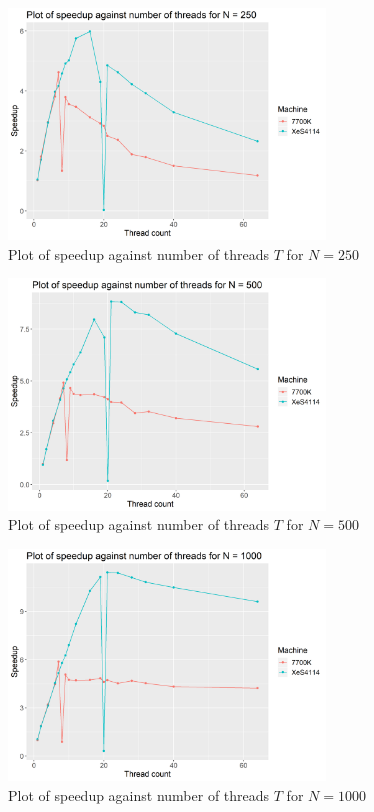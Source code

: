 \documentclass[12pt]{article}
\begin{document}
\begin{figure}[H]
    \centering
    \includegraphics[width=0.75\textwidth]{./processedResults/par-250N-speedup}
    \caption{Plot of speedup against number of threads $T$ for $N = 250$}
    \label{fig:par-250N-speedup}
\end{figure}

\begin{figure}[H]
    \centering
    \includegraphics[width=0.75\textwidth]{./processedResults/par-500N-speedup}
    \caption{Plot of speedup against number of threads $T$ for $N = 500$}
    \label{fig:par-500N-speedup}
\end{figure}

\begin{figure}[H]
    \centering
    \includegraphics[width=0.75\textwidth]{./processedResults/par-1000N-speedup}
    \caption{Plot of speedup against number of threads $T$ for $N = 1000$}
    \label{fig:par-1000N-speedup}
\end{figure}
\end{document}
